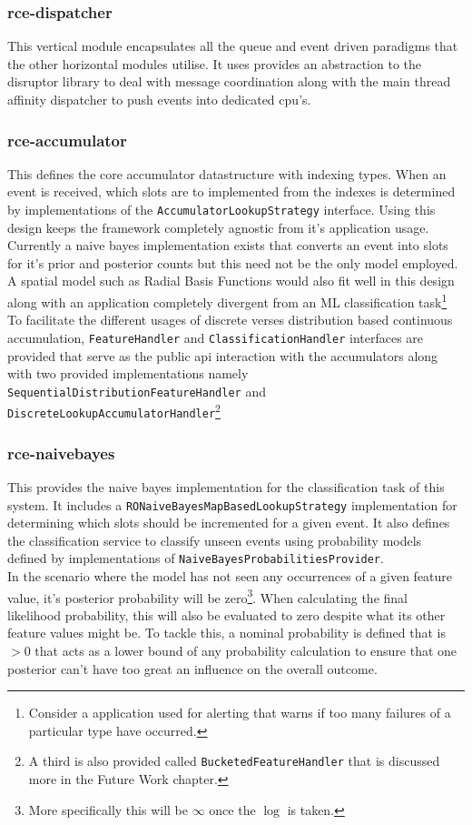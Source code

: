 \documentclass[a4paper,11pt]{scrreprt}
\begin{document}
\subsubsection{rce-dispatcher}
This vertical module encapsulates all the queue and event driven paradigms that the other horizontal modules utilise. It uses provides an abstraction to the disruptor library to deal with message coordination along with the main thread affinity dispatcher to push events into dedicated \acrshort{cpu}'s.

\subsubsection{rce-accumulator}
This defines the core accumulator datastructure with indexing types. When an event is received, which slots are to implemented from the indexes is determined by implementations of the \verb|AccumulatorLookupStrategy| interface. Using this design keeps the framework completely agnostic from it's application usage. Currently a naive bayes implementation exists that converts an event into slots for it's prior and posterior counts but this need not be the only model employed. A spatial model such as Radial Basis Functions would also fit well in this design along with an application completely divergent from an ML classification task\footnote{Consider a application used for alerting that warns if too many failures of a particular type have occurred.}\\
To facilitate the different usages of discrete verses distribution based continuous accumulation, \verb|FeatureHandler| and \verb|ClassificationHandler| interfaces are provided that serve as the public \acrshort{api} interaction with the accumulators along with two provided implementations namely \verb|SequentialDistributionFeatureHandler| and\\ \verb|DiscreteLookupAccumulatorHandler|\footnote{A third is also provided called \verb|BucketedFeatureHandler| that is discussed more in the Future Work chapter.}

\subsubsection{rce-naivebayes}
This provides the naive bayes implementation for the classification task of this system. It includes a \verb|RONaiveBayesMapBasedLookupStrategy| implementation for determining which slots should be incremented for a given event. It also defines the classification service to classify unseen events using probability models defined by implementations of \verb|NaiveBayesProbabilitiesProvider|. \\In the scenario where the model has not seen any occurrences of a given feature value, it's posterior probability will be zero\footnote{More specifically this will be \(\infty\) once the \(\log\) is taken.}. When calculating the final likelihood probability, this will also be evaluated to zero despite what its other feature values might be. To tackle this, a nominal probability is defined that is \(> 0\) that acts as a lower bound of any probability calculation to ensure that one posterior can't have too great an influence on the overall outcome.  
\end{document}
